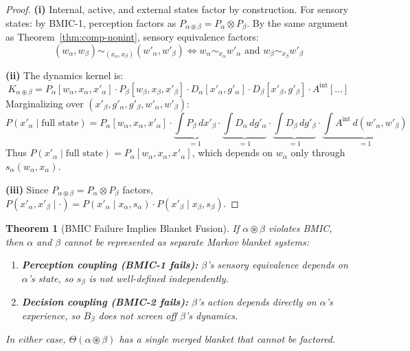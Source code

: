 \documentclass[11pt,a4paper]{article}
\newtheorem{theorem}{Theorem}[section]
\begin{document}
\begin{proof}
\textbf{(i)} Internal, active, and external states factor by construction. For sensory states: by BMIC-1, perception factors as $P_{\alpha \circledast \beta} = P_\alpha \otimes P_\beta$. By the same argument as Theorem~\ref{thm:comp-nonint}, sensory equivalence factors:
\[
(w_\alpha, w_\beta) \sim_{(x_\alpha, x_\beta)} (w'_\alpha, w'_\beta) \iff w_\alpha \sim_{x_\alpha} w'_\alpha \text{ and } w_\beta \sim_{x_\beta} w'_\beta
\]

\textbf{(ii)} The dynamics kernel is:
\[
K_{\alpha \circledast \beta} = P_\alpha[w_\alpha, x_\alpha, x'_\alpha] \cdot P_\beta[w_\beta, x_\beta, x'_\beta] \cdot D_\alpha[x'_\alpha, g'_\alpha] \cdot D_\beta[x'_\beta, g'_\beta] \cdot A^{\text{int}}[\ldots]
\]
Marginalizing over $(x'_\beta, g'_\alpha, g'_\beta, w'_\alpha, w'_\beta)$:
\[
P(x'_\alpha \mid \text{full state}) = P_\alpha[w_\alpha, x_\alpha, x'_\alpha] \cdot \underbrace{\int P_\beta \, dx'_\beta}_{=1} \cdot \underbrace{\int D_\alpha \, dg'_\alpha}_{=1} \cdot \underbrace{\int D_\beta \, dg'_\beta}_{=1} \cdot \underbrace{\int A^{\text{int}} \, d(w'_\alpha, w'_\beta)}_{=1}
\]
Thus $P(x'_\alpha \mid \text{full state}) = P_\alpha[w_\alpha, x_\alpha, x'_\alpha]$, which depends on $w_\alpha$ only through $s_\alpha(w_\alpha, x_\alpha)$.

\textbf{(iii)} Since $P_{\alpha \circledast \beta} = P_\alpha \otimes P_\beta$ factors, $P(x'_\alpha, x'_\beta \mid \cdot) = P(x'_\alpha \mid x_\alpha, s_\alpha) \cdot P(x'_\beta \mid x_\beta, s_\beta)$.
\end{proof}

\begin{theorem}[BMIC Failure Implies Blanket Fusion]\label{thm:bmic-nec}
If $\alpha \circledast \beta$ violates BMIC, then $\alpha$ and $\beta$ cannot be represented as separate Markov blanket systems:
\begin{enumerate}[nosep]
    \item[(i)] \textbf{Perception coupling (BMIC-1 fails):} $\beta$'s sensory equivalence depends on $\alpha$'s state, so $s_\beta$ is not well-defined independently.
    \item[(ii)] \textbf{Decision coupling (BMIC-2 fails):} $\beta$'s action depends directly on $\alpha$'s experience, so $B_\beta$ does not screen off $\beta$'s dynamics.
\end{enumerate}
In either case, $\Theta(\alpha \circledast \beta)$ has a single merged blanket that cannot be factored.
\end{theorem}
\end{document}
